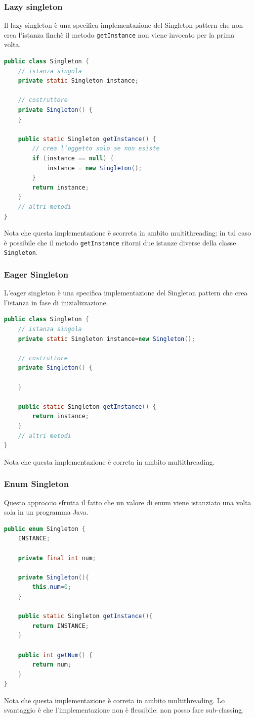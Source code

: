 \documentclass{article}
\begin{document}
\subsubsection{Lazy singleton}
Il lazy singleton \`e una specifica implementazione del Singleton pattern che non crea l'istanza finch\`e il metodo \texttt{getInstance} non viene invocato per la prima volta.
\begin{lstlisting}[language=Java]
public class Singleton {
	// istanza singola
	private static Singleton instance;

	// costruttore
	private Singleton() {
	}

	public static Singleton getInstance() {
		// crea l’oggetto solo se non esiste
		if (instance == null) {
			instance = new Singleton();
		}
		return instance;
	}
	// altri metodi
}
\end{lstlisting}
Nota che questa implementazione \`e scorreta in ambito multithreading: in tal caso \`e possibile che il metodo \texttt{getInstance} ritorni due  istanze diverse della classe \texttt{Singleton}.

\subsubsection{Eager Singleton}
L'eager singleton \`e una specifica implementazione del Singleton pattern che crea l'istanza in fase di inizializzazione. 
\begin{lstlisting}[language=Java]
public class Singleton {
	// istanza singola
	private static Singleton instance=new Singleton();

	// costruttore
	private Singleton() {
	   
	}

	public static Singleton getInstance() {
		return instance;
	}
	// altri metodi
}
\end{lstlisting}
Nota che questa implementazione \`e correta in ambito multithreading.

\subsubsection{Enum Singleton}
Questo approccio sfrutta il fatto che un valore di enum viene istanziato una volta sola in un programma Java. 
\begin{lstlisting}[language=Java]
public enum Singleton {
	INSTANCE;
	
	private final int num;
	
	private Singleton(){
		this.num=0;
	}
	
	public static Singleton getInstance(){
		return INSTANCE;
	}

	public int getNum() {
		return num;
	}
}
\end{lstlisting}
Nota che questa implementazione \`e correta in ambito multithreading. Lo svantaggio \`e che l'implementazione non \`e flessibile: non posso fare sub-classing.
\end{document}
